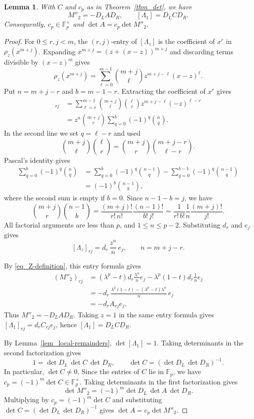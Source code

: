 \documentclass{amsart}
\newtheorem{lemma}[theorem]{Lemma}
\numberwithin{equation}{section}
\begin{document}
\begin{lemma}\label{lem_comparison-A}
With $C$ and $c_p$ as in Theorem~\ref{thm_det}, we have
\[
  M''_2=-D_LAD_R,\qquad [\Lambda_1]=D_LCD_R.
\]
Consequently, $c_p\in\mathbb F_p^\times$ and
$\det A=c_p\det M''_2$.
\end{lemma}

\begin{proof}
For $0\le r,j<m$, the $(r,j)$-entry of $[\Lambda_z]$
is the coefficient of $x^r$ in $\rho_z(x^{m+j})$.
Expanding $x^{m+j}=(z+(x-z))^{m+j}$ and discarding terms
divisible by $(x-z)^m$ gives
\[
  \rho_z(x^{m+j})
    =\sum_{\ell=0}^{m-1}
       \binom{m+j}{\ell}z^{m+j-\ell}(x-z)^\ell.
\]
Put $n=m+j-r$ and $b=m-1-r$. Extracting the
coefficient of $x^r$ gives
\begin{align*}
  [\Lambda_z]_{rj}
    &=\sum_{\ell=r}^{m-1}
      \binom{m+j}{\ell}\binom{\ell}{r}
      z^{m+j-\ell}(-z)^{\ell-r}\\
    &=z^n\binom{m+j}{r}
      \sum_{q=0}^{b}(-1)^q\binom{n}{q}.
\end{align*}
In the second line we set $q=\ell-r$ and used
\[
  \binom{m+j}{\ell}\binom{\ell}{r}
    =\binom{m+j}{r}\binom{m+j-r}{\ell-r}.
\]
Pascal's identity gives
\begin{align*}
  \sum_{q=0}^{b}(-1)^q\binom{n}{q}
    &=\sum_{q=0}^{b}(-1)^q\binom{n-1}{q}
      -\sum_{q=0}^{b-1}(-1)^q\binom{n-1}{q}\\
    &=(-1)^b\binom{n-1}{b},
\end{align*}
where the second sum is empty if $b=0$.
Since $n-1-b=j$, we have
\[
  \binom{m+j}{r}\binom{n-1}{b}
    =\frac{(m+j)!}{r!\,n!}\frac{(n-1)!}{b!\,j!}
    =\frac{1}{r!\,b!}\frac{1}{n}\frac{(m+j)!}{j!}.
\]
All factorial arguments are less than $p$, and
$1\le n\le p-2$. Substituting $d_r$ and $e_j$ gives
\[
  [\Lambda_z]_{rj}=d_r\,\frac{z^n}{n}\,e_j,
  \qquad n=m+j-r.
\]

By \eqref{eq_Z-definition}, this entry formula gives
\begin{align*}
  (M''_2)_{rj}
    &=(\lambda^p-t)d_r\frac{\lambda^n}{n}e_j
      -\lambda^p(1-t)d_r\frac{1}{n}e_j\\
    &=-d_r\,\frac{\lambda^p(1-t)-(\lambda^p-t)\lambda^n}{n}\,e_j\\
    &=-d_r A_{rj}e_j.
\end{align*}
Thus $M''_2=-D_LAD_R$. Taking $z=1$ in the same entry
formula gives $[\Lambda_1]_{rj}=d_r C_{rj}e_j$, hence
$[\Lambda_1]=D_LCD_R$.

By Lemma~\ref{lem_local-remainders}, $\det[\Lambda_1]=1$.
Taking determinants in the second factorization gives
\[
  1=\det D_L\,\det C\,\det D_R,
  \qquad
  \det C=(\det D_L\,\det D_R)^{-1}.
\]
In particular, $\det C\ne0$. Since the entries of $C$
lie in $\mathbb F_p$, we have
$c_p=(-1)^m\det C\in\mathbb F_p^\times$.
Taking determinants in the first factorization gives
\[
  \det M''_2=(-1)^m\det D_L\,\det A\,\det D_R.
\]
Multiplying by $c_p=(-1)^m\det C$ and substituting
$\det C=(\det D_L\,\det D_R)^{-1}$ gives
$\det A=c_p\det M''_2$.
\end{proof}
\end{document}
